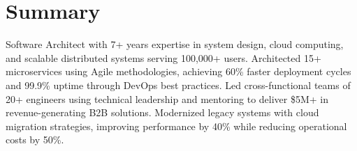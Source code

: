 \documentclass[letterpaper,11pt]{article}
\begin{document}





\section{Summary}
  Software Architect with 7+ years expertise in system design, cloud computing, and scalable distributed systems serving 100,000+ users.
  Architected 15+ microservices using Agile methodologies, achieving 60\% faster deployment cycles and 99.9\% uptime through DevOps best practices.
  Led cross-functional teams of 20+ engineers using technical leadership and mentoring to deliver \$5M+ in revenue-generating B2B solutions.
  Modernized legacy systems with cloud migration strategies, improving performance by 40\% while reducing operational costs by 50\%.









\end{document}
